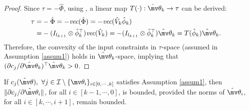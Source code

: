 \documentclass[lettersize,journal]{IEEEtran}
\newcommand*{\wth}{\mv\theta}
\begin{document}

\begin{proof}

Since $\tau = -\hat\Phi$, using \cite[Proposition 7.1.9]{RN17}, a linear map $T(\cdot):\hat\wth_k\to\tau$ can be derived: 
\begin{equation}\label{eq linear map}
    \begin{aligned}
    \tau = &-\hat\Phi = -\textit{vec}(\hat\Phi)     = -\textit{vec}(\hat V_k \hat\phi_k) 
    \\
    = & -(I_{l_{k+1}}\otimes \hat\phi_k^\top)\textit{vec}(\hat V_k)
    =-(I_{l_{k+1}}\otimes \hat\phi_k^\top)\hat\wth_k = T(\hat\phi_k) \hat\wth_k.
    \end{aligned}
\end{equation}
Therefore, the convexity of the input constraints in $\tau$-space (assumed in Assumption \ref{assum1}) holds in $\hat\wth_k$-space, implying
that $(\partial c_j/\partial \hat\wth_k)^\top\hat\wth_k>0$.

\end{proof}


\begin{lem} 
    If $c_j(\hat\wth),\ \forall j\in\mathcal I \setminus \{\wth_i\}_{i\in[0,\cdots,k]}$ satisfies Assumption \ref{assum1}, then $\Vert\partial c_j/\partial\hat\wth_i\Vert$, for all $i\in[k-1,\cdots, 0]$, is bounded, provided the norms of $\hat\wth_i$, for all $i\in[k,\cdots, i+1]$, remain bounded.
    \label{lem2}
\end{lem}
\end{document}
